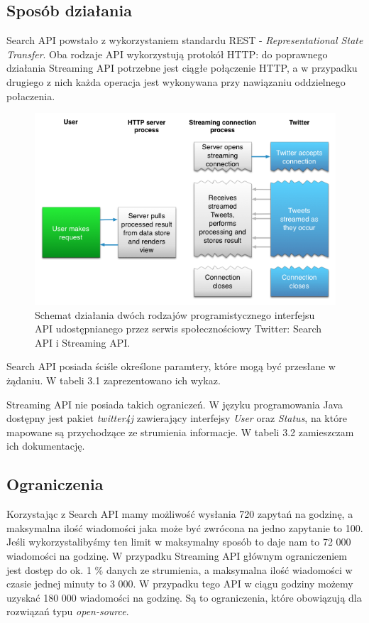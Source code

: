 \subsection{Sposób działania}
Search API powstało z wykorzystaniem standardu REST - \textit{Representational State Transfer}. Oba rodzaje API wykorzystują protokół HTTP: do poprawnego działania Streaming API potrzebne jest ciągłe połączenie HTTP, a w przypadku drugiego z nich każda operacja jest wykonywana przy nawiązaniu oddzielnego połaczenia.

\begin{figure}[h] %
	\centering
	\includegraphics[width=0.6\linewidth]{img/twitter_api_comparison}
	\caption{Schemat działania dwóch rodzajów programistycznego interfejsu API udostępnianego przez serwis społecznościowy Twitter: Search API i Streaming API.}
\end{figure}

Search API posiada ściśle określone paramtery, które mogą być przesłane w żądaniu. W tabeli 3.1 zaprezentowano ich wykaz.




Streaming API nie posiada takich ograniczeń. W języku programowania Java dostępny jest pakiet \textit{twitter4j} zawierający interfejsy \textit{User} oraz \textit{Status}, na które mapowane są przychodzące ze strumienia informacje. W tabeli 3.2 zamieszczam ich dokumentację.





\subsection{Ograniczenia}
Korzystając z Search API mamy możliwość wysłania 720 zapytań na godzinę, a maksymalna ilość wiadomości jaka może być zwrócona na jedno zapytanie to 100. Jeśli wykorzystalibyśmy ten limit w maksymalny sposób to daje nam to 72 000 wiadomości na godzinę. W przypadku Streaming API głównym ograniczeniem jest dostęp do ok. 1 \% danych ze strumienia, a maksymalna ilość wiadomości w czasie jednej minuty to 3 000. W przypadku tego API w ciągu godziny możemy uzyskać 180 000 wiadomości na godzinę. Są to ograniczenia, które obowiązują dla rozwiązań typu \textit{open-source}.

